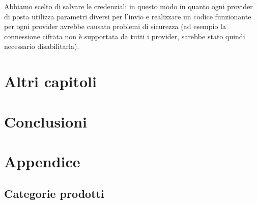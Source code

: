 Abbiamo scelto di salvare le credenziali in questo modo in quanto ogni provider di posta utilizza parametri diversi per l'invio e realizzare un codice funzionante per ogni provider avrebbe causato problemi di sicurezza (ad esempio la connessione cifrata non è supportata da tutti i provider, sarebbe stato quindi necessario disabilitarla).




\chapter{Altri capitoli}
\chapter{Conclusioni}

\chapter{Appendice}
\section{Categorie prodotti}


